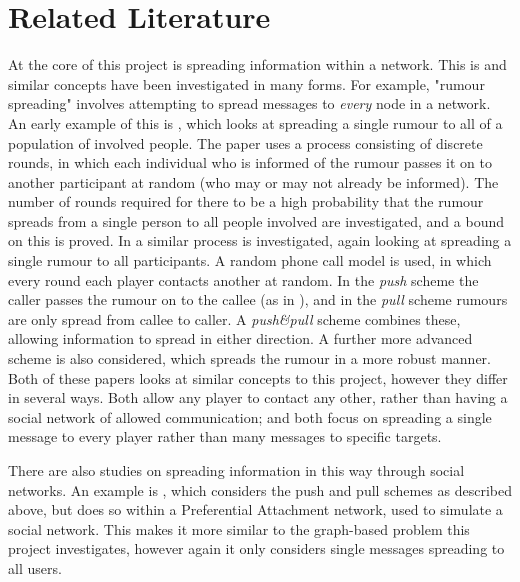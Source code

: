 \documentclass[bsc,frontabs,twoside,singlespacing,parskip,deptreport]{infthesis}     %
\begin{document}
\section{Related Literature}
At the core of this project is spreading information within a network. This is and similar concepts have been investigated in many forms. For example, "rumour spreading" involves attempting to spread messages to \textit{every} node in a network. An early example of this is \cite{Pittel87}, which looks at spreading a single rumour to all of a population of involved people. The paper uses a process consisting of discrete rounds, in which each individual who is informed of the rumour passes it on to another participant at random (who may or may not already be informed). The number of rounds required for there to be a high probability that the rumour spreads from a single person to all people involved are investigated, and a bound on this is proved. In \cite{KarpSSV00} a similar process is investigated, again looking at spreading a single rumour to all participants. A random phone call model is used, in which every round each player contacts another at random. In the \textit{push} scheme the caller passes the rumour on to the callee (as in \cite{Pittel87}), and in the \textit{pull} scheme rumours are only spread from callee to caller. A \textit{push\&pull} scheme combines these, allowing information to spread in either direction. A further more advanced scheme is also considered, which spreads the rumour in a more robust manner. Both of these papers looks at similar concepts to this project, however they differ in several ways. Both allow any player to contact any other, rather than having a social network of allowed communication; and both focus on spreading a single message to every player rather than many messages to specific targets.

There are also studies on spreading information in this way through social networks. An example is \cite{SocialNetworkRumours}, which considers the push and pull schemes as described above, but does so within a Preferential Attachment network, used to simulate a social network. This makes it more similar to the graph-based problem this project investigates, however again it only considers single messages spreading to all users.
\end{document}
